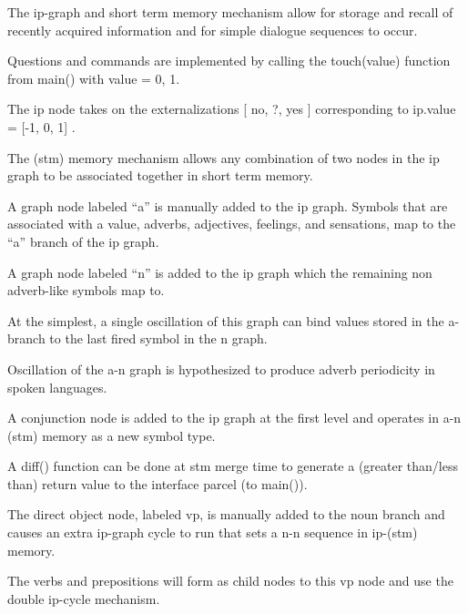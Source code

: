 \documentclass{clv3}
\begin{document}
\begin{unenumerate}
\item The ip-graph and short term memory mechanism allow for storage  and recall of recently acquired information and for simple dialogue sequences to occur.

\item Questions and commands are implemented by calling the touch(value) function  from main() with value = 0, 1.   

\item The ip node takes on the externalizations [ no, ?, yes ] corresponding to  ip.value = [-1, 0, 1] .




\item The (stm) memory mechanism allows any combination of two nodes in the ip graph to be associated together in short term memory.

\item A graph node  labeled “a”  is manually added to the ip graph.  Symbols that are associated with a value, adverbs, adjectives, feelings, and sensations, map to the ``a'' branch of the ip graph.  


\item A graph node labeled “n” is added to the ip graph which the remaining non adverb-like symbols map to.

\item At the simplest, a single oscillation of this graph can bind values stored in the a-branch to the last fired symbol in the n graph.  


\item Oscillation of the a-n graph is hypothesized to produce adverb periodicity in spoken languages.


\item A conjunction node is added to the ip graph at the first level and operates in a-n (stm) memory as a new symbol type.     

\item A diff() function can be done at stm merge time to generate a (greater than/less than) return value to the interface parcel (to main()).  


\item The direct object node, labeled vp, is manually added to the noun branch and causes an extra ip-graph cycle to run that sets a n-n sequence in ip-(stm) memory.   

\item The verbs and prepositions will form as child nodes to this vp node and use the double ip-cycle mechanism.


\end{unenumerate}
\end{document}
